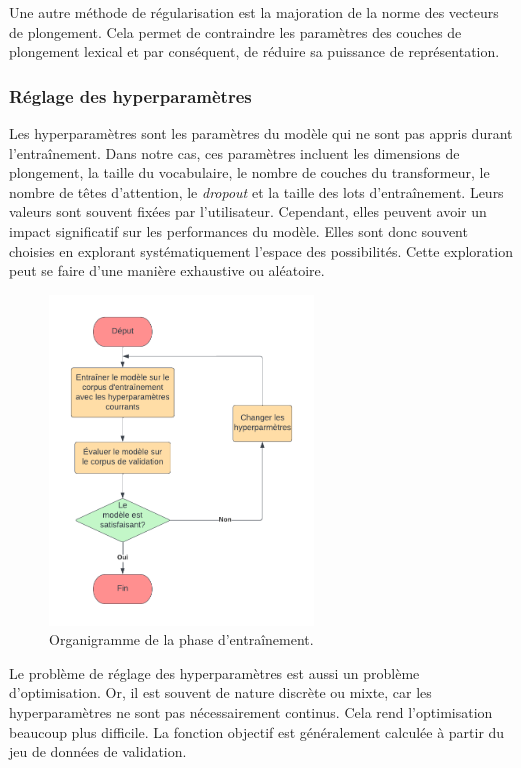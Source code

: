 Une autre méthode de régularisation est la majoration de la norme des vecteurs de plongement.
Cela permet de contraindre les paramètres des couches de plongement lexical
et par conséquent, de réduire sa puissance de représentation.



\subsubsection{Réglage des hyperparamètres}

Les hyperparamètres sont les paramètres du modèle qui ne sont pas appris durant l'entraînement.
Dans notre cas, ces paramètres incluent les dimensions de plongement, 
la taille du vocabulaire, le nombre de couches du transformeur, 
le nombre de têtes d'attention, 
le \emph{\foreignlanguage{english}{dropout}} et la taille des lots d'entraînement.
Leurs valeurs sont souvent fixées par l'utilisateur.
Cependant, elles peuvent avoir un impact significatif sur les performances du modèle.
Elles sont donc souvent choisies en explorant systématiquement l'espace des possibilités.
Cette exploration peut se faire d'une manière exhaustive ou aléatoire.

\begin{figure}[htb]
    \begin{center}
        \includegraphics[width=7cm]{assets/pdf/Training.pdf}
    \end{center}
    \caption{Organigramme de la phase d'entraînement.}
    \label{fig.training}
\end{figure}

Le problème de réglage des hyperparamètres est aussi un problème d'optimisation.
Or, il est souvent de nature discrète ou mixte, car les hyperparamètres ne sont pas nécessairement continus.
Cela rend l'optimisation beaucoup plus difficile.
La fonction objectif est généralement calculée à partir du jeu de données de validation.

